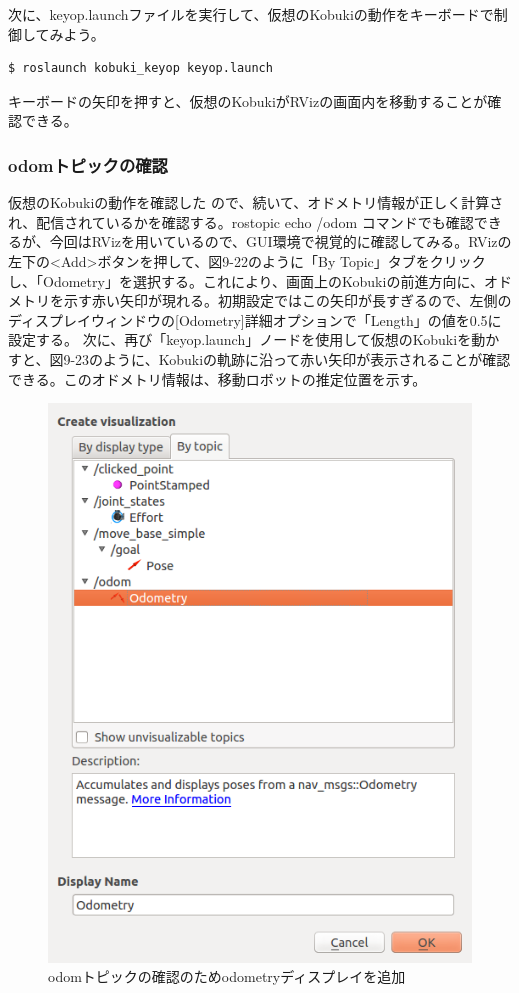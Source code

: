 \begin{itemize}
次に、keyop.launchファイルを実行して、仮想のKobukiの動作をキーボードで制御してみよう。

\begin{lstlisting}[language=ROS]
$ roslaunch kobuki_keyop keyop.launch
\end{lstlisting}

キーボードの矢印を押すと、仮想のKobukiがRVizの画面内を移動することが確認できる。

\subsubsection{odomトピックの確認}

仮想のKobukiの動作を確認した  ので、続いて、オドメトリ情報が正しく計算され、配信されているかを確認する。rostopic echo /odom コマンドでも確認できるが、今回はRVizを用いているので、GUI環境で視覚的に確認してみる。RVizの左下の<Add>ボタンを押して、図9-22のように「By Topic」タブをクリックし、「Odometry」を選択する。これにより、画面上のKobukiの前進方向に、オドメトリを示す赤い矢印が現れる。初期設定ではこの矢印が長すぎるので、左側のディスプレイウィンドウの[Odometry]詳細オプションで「Length」の値を0.5に設定する。
次に、再び「keyop.launch」ノードを使用して仮想のKobukiを動かすと、図9-23のように、Kobukiの軌跡に沿って赤い矢印が表示されることが確認できる。このオドメトリ情報は、移動ロボットの推定位置を示す。

\begin{figure}[ht]
  \centering
  \includegraphics[width=\columnwidth]{pictures/chapter9/pic_09_22.png}
  \caption{odomトピックの確認のためodometryディスプレイを追加}
\end{figure}


\end{itemize}
